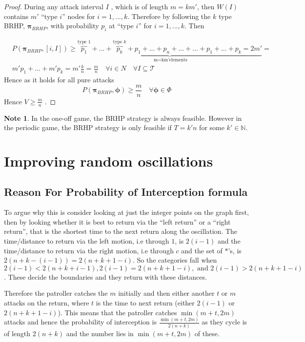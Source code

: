 \documentclass[a4paper,10pt]{article}
\theoremstyle{definition}
\theoremstyle{definition}
\theoremstyle{remark}
\theoremstyle{definition}
\newtheorem*{note}{Note}
\begin{document}
\begin{proof}
During any attack interval $I$ , which is of length $m=km'$, then $W(I)$ contains $m'$ ``type $i$'' nodes for $i=1,...,k$. Therefore by following the $k$ type BRHP, $\bm{\pi}_{BRHP}$, with probability $p_{i}$ at ``type $i$'' for $i=1,...,k$. Then

\begin{align*}
&P(\bm{\pi}_{BRHP},[i,I]) \geq \underbrace{\overbrace{p_{1}}^{\text{type } 1}+...+
\overbrace{p_{k}}^{\text{type } k}+p_{1}+...+p_{n}+...+...+p_{1}+...+p_{k}=2m'}_{\text{ m=km'elements}}= \\
&m' p_{1}+...+m'p_{k}=m' \frac{k}{n}=\frac{m}{n} \quad \forall i \in N \quad \forall I \subseteq \mathcal{T}
\end{align*}
Hence as it holds for all pure attacks
$$P(\bm{\pi}_{BRHP},\pmb{\phi}) \geq \frac{m}{n} \quad \forall \bm{\phi} \in \Phi$$
Hence $V \geq \frac{m}{n}$ .
\end{proof}

\begin{note}
In the one-off game, the BRHP strategy is always feasible. However in the periodic game, the BRHP strategy is only feasible if $T=k'n$ for some $k' \in \mathbb{N}$.
\end{note}

\section{Improving random oscillations}
\label{Appendix:Improving random oscillations}

\subsection{Reason For Probability of Interception formula}
\label{Appendix:Reason for probability of interception}
To argue why this is consider looking at just the integer points on the graph first,
then by looking whether it is best to return via the ``left return'' or a ``right return'', that is the shortest time to the next return along the oscillation. The time/distance to return via the left motion, i.e through $1$, is $2(i-1)$ and the time/distance to return via the right motion, i.e through $c$ and the set of $*$'s, is $2(n+k-(i-1))=2(n+k+1-i)$. So the categories fall when $2(i-1) < 2(n+k+i-1) , 2(i-1)=2(n+k+1-i) , \text{ and } 2(i-1) > 2(n+k+1-i)$. These decide the boundaries and they return with these distances.

Therefore the patroller catches the $m$ initially and then either another $t$ or $m$ attacks on the return, where $t$ is the time to next return (either $2(i-1)$ or $2(n+k+1-i)$). This means that the patroller catches $\min(m+t,2m)$ attacks and hence the probability of interception is $\frac{\min(m+t,2m)}{2(n+k)}$ as they cycle is of length $2(n+k)$ and the number lies in $\min(m+t,2m)$ of these.
\end{document}
